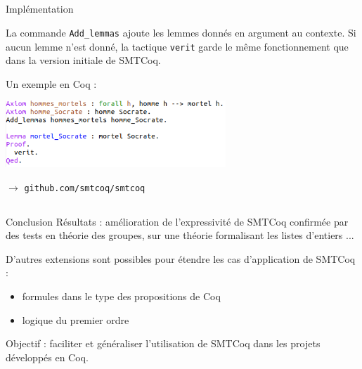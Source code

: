 \documentclass{beamer}
\begin{document}
    \subsection{}
    \begin{frame}{Implémentation}

      La commande \texttt{Add\_lemmas} ajoute les lemmes donnés en argument au contexte. Si aucun lemme n'est donné, la tactique \texttt{verit} garde le même fonctionnement que dans la version initiale de SMTCoq.

      \vspace{3mm}
      Un exemple en Coq :

      \begin{center}
        \includegraphics[height=2.5cm]{socrate.png}
      \end{center}
      \vspace{3mm}

      $\longrightarrow $ \texttt{github.com/smtcoq/smtcoq}


    \end{frame}

    \subsection{}
    \begin{frame}{Conclusion}
      Résultats : amélioration de l'expressivité de SMTCoq confirmée par des tests en théorie des groupes, sur une théorie formalisant les listes d'entiers ...

      \vspace{5mm}

      D'autres extensions sont possibles pour étendre les cas d'application de SMTCoq :

      \begin{itemize}
      \item formules dans le type des propositions de Coq
      \item logique du premier ordre
      \end{itemize}

      \vspace{5mm}

      Objectif : faciliter et généraliser l'utilisation de SMTCoq dans les projets développés en Coq.

    \end{frame}


    
\end{document}
